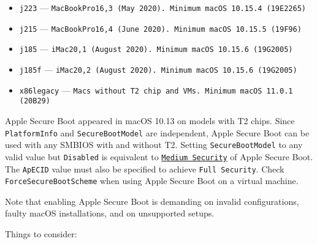 \documentclass[]{article}
\begin{document}
\begin{enumerate}
\begin{itemize}
  \item \texttt{j223} --- \texttt{MacBookPro16,3 (May 2020). Minimum macOS 10.15.4 (19E2265)}
  \item \texttt{j215} --- \texttt{MacBookPro16,4 (June 2020). Minimum macOS 10.15.5 (19F96)}
  \item \texttt{j185} --- \texttt{iMac20,1 (August 2020). Minimum macOS 10.15.6 (19G2005)}
  \item \texttt{j185f} --- \texttt{iMac20,2 (August 2020). Minimum macOS 10.15.6 (19G2005)}
  \item \texttt{x86legacy} --- \texttt{Macs without T2 chip and VMs. Minimum macOS 11.0.1 (20B29)}
  \end{itemize}

  Apple Secure Boot appeared in macOS 10.13 on models with T2 chips.
  Since \texttt{PlatformInfo} and \texttt{SecureBootModel} are independent,
  Apple Secure Boot can be used with any SMBIOS with and without T2.
  Setting \texttt{SecureBootModel} to any valid value but \texttt{Disabled}
  is equivalent to
  \href{https://support.apple.com/en-us/HT208330}{\texttt{Medium Security}}
  of Apple Secure Boot. The \texttt{ApECID} value must also be specified to
  achieve \texttt{Full Security}. Check \texttt{ForceSecureBootScheme}
  when using Apple Secure Boot on a virtual machine.

  Note that enabling Apple Secure Boot is demanding on invalid configurations,
  faulty macOS installations, and on unsupported setups.

  Things to consider:


\end{enumerate}
\end{document}
